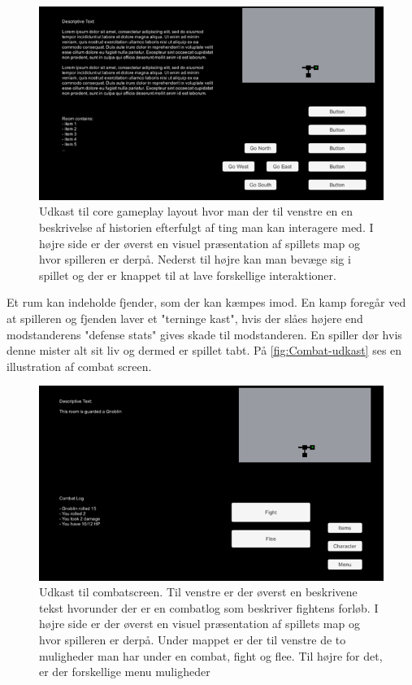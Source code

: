 \begin{figure}[H]
\centering
\includegraphics[width = \textwidth]{02-Body/Images/SpilLayout-udkast.png}
\caption{Udkast til core gameplay layout hvor man der til venstre en en beskrivelse af historien efterfulgt af ting man kan interagere med. I højre side er der øverst en visuel præsentation af spillets map og hvor spilleren er derpå. Nederst til højre kan man bevæge sig i spillet og der er knappet til at lave forskellige interaktioner.}
\label{fig:Core-Gameplay-Layout-udkast}
\end{figure}

Et rum kan indeholde fjender, som der kan kæmpes imod. En kamp foregår ved at spilleren og fjenden laver et "terninge kast", hvis der slåes højere end modstanderens "defense stats" gives skade til modstanderen. En spiller dør hvis denne mister alt sit liv og dermed er spillet tabt. På \autoref{fig:Combat-udkast} ses en illustration af combat screen.

\begin{figure}[H]
\centering
\includegraphics[width = \textwidth]{02-Body/Images/CombatScreen-udkast.png}
\caption{Udkast til combatscreen. Til venstre er der øverst en beskrivene tekst hvorunder der er en combatlog som beskriver fightens forløb. I højre side er der øverst en visuel præsentation af spillets map og hvor spilleren er derpå. Under mappet er der til venstre de to muligheder man har under en combat, fight og flee. Til højre for det, er der forskellige menu muligheder}
\label{fig:Combat-udkast}
\end{figure}

